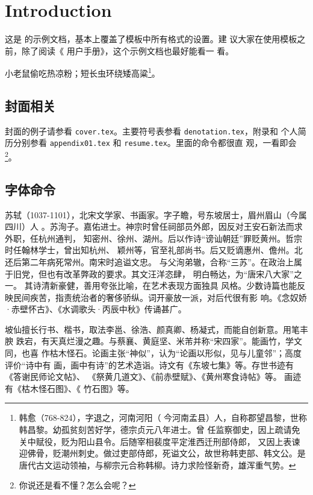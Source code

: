 \chapter{Introduction}
\label{cha:intro}

这是 \thuthesis\cite{thuthesis} 的示例文档，基本上覆盖了模板中所有格式的设置。建
议大家在使用模板之前，除了阅读《\thuthesis{} 用户手册》，这个示例文档也最好能看一
看。

小老鼠偷吃热凉粉；短长虫环绕矮高粱\footnote{韩愈（768-824），字退之，河南河阳（
  今河南孟县）人，自称郡望昌黎，世称韩昌黎。幼孤贫刻苦好学，德宗贞元八年进士。曾
  任监察御史，因上疏请免关中赋役，贬为阳山县令。后随宰相裴度平定淮西迁刑部侍郎，
  又因上表谏迎佛骨，贬潮州刺史。做过吏部侍郎，死谥文公，故世称韩吏部、韩文公。是
  唐代古文运动领袖，与柳宗元合称韩柳。诗力求险怪新奇，雄浑重气势。}。


\section{封面相关}
封面的例子请参看 \texttt{cover.tex}。主要符号表参看 \texttt{denotation.tex}，附录和
个人简历分别参看 \texttt{appendix01.tex} 和 \texttt{resume.tex}。里面的命令都很直
观，一看即会\footnote{你说还是看不懂？怎么会呢？}。

\section{字体命令}
\label{sec:first}

苏轼（1037-1101），北宋文学家、书画家。字子瞻，号东坡居士，眉州眉山（今属四川）人
。苏洵子。嘉佑进士。神宗时曾任祠部员外郎，因反对王安石新法而求外职，任杭州通判，
知密州、徐州、湖州。后以作诗“谤讪朝廷”罪贬黄州。哲宗时任翰林学士，曾出知杭州、
颖州等，官至礼部尚书。后又贬谪惠州、儋州。北还后第二年病死常州。南宋时追谥文忠。
与父洵弟辙，合称“三苏”。在政治上属于旧党，但也有改革弊政的要求。其文汪洋恣肆，
明白畅达，为“唐宋八大家”之一。  其诗清新豪健，善用夸张比喻，在艺术表现方面独具
风格。少数诗篇也能反映民间疾苦，指责统治者的奢侈骄纵。词开豪放一派，对后代很有影
响。《念奴娇·赤壁怀古》、《水调歌头·丙辰中秋》传诵甚广。

{\kaishu 坡仙擅长行书、楷书，取法李邕、徐浩、颜真卿、杨凝式，而能自创新意。用笔丰腴
  跌宕，有天真烂漫之趣。与蔡襄、黄庭坚、米芾并称“宋四家”。能画竹，学文同，也喜
  作枯木怪石。论画主张“神似”，认为“论画以形似，见与儿童邻”；高度评价“诗中有
  画，画中有诗”的艺术造诣。诗文有《东坡七集》等。存世书迹有《答谢民师论文帖》、
  《祭黄几道文》、《前赤壁赋》、《黄州寒食诗帖》等。  画迹有《枯木怪石图》、《
  竹石图》等。}


